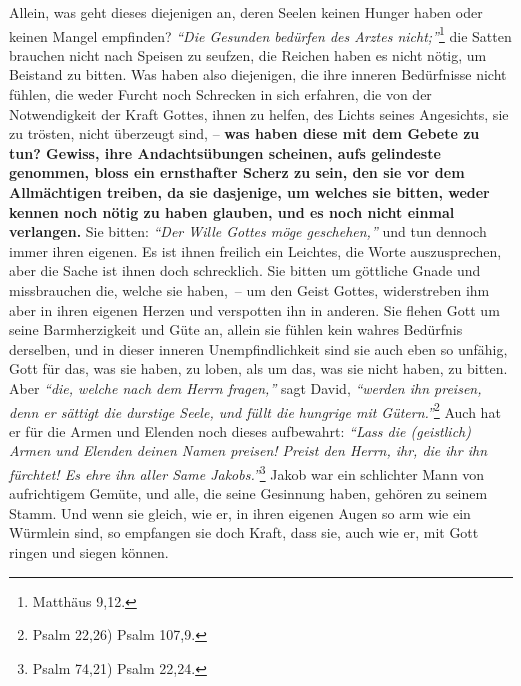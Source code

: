  Allein, was geht dieses
diejenigen an, deren Seelen keinen Hunger haben oder keinen Mangel empfinden?
\textit{"`Die Gesunden bedürfen des Arztes nicht;"'}\footnote{Matthäus 9,12.}
die Satten brauchen nicht nach Speisen zu
seufzen, die Reichen haben es nicht nötig, um Beistand zu bitten. Was haben also
diejenigen, die ihre inneren Bedürfnisse nicht
fühlen, die weder Furcht noch
Schrecken in sich erfahren, die von der Notwendigkeit der Kraft Gottes, ihnen
zu helfen, des Lichts seines Angesichts, sie zu trösten, nicht
überzeugt sind, \label{ref:06_07_sinnlose_gebete}
-- \textbf{was haben diese mit dem Gebete zu tun? Gewiss, ihre Andachtsübungen
scheinen, aufs gelindeste genommen, bloss ein ernsthafter Scherz zu sein, den
sie vor dem Allmächtigen treiben, da sie dasjenige, um welches sie bitten, weder
kennen noch nötig zu haben glauben, und es noch nicht einmal verlangen.} Sie
bitten:
\textit{"`Der Wille Gottes möge geschehen,"'}
und tun dennoch immer ihren
eigenen. Es ist ihnen freilich ein
Leichtes, die Worte auszusprechen, aber die
Sache ist ihnen doch schrecklich. Sie bitten um göttliche Gnade und
missbrauchen die, welche sie haben,~-- um den Geist Gottes, widerstreben ihm
aber in ihren eigenen Herzen und verspotten ihn in anderen.
Sie flehen Gott um
seine Barmherzigkeit und Güte an, allein sie fühlen kein wahres Bedürfnis
derselben, und in dieser inneren Unempfindlichkeit sind sie auch eben so
unfähig, Gott für das, was sie haben, zu loben, als um das, was sie nicht haben,
zu bitten. Aber \textit{"`die, welche nach dem Herrn fragen,"'} sagt David,
\textit{"`werden ihn preisen, denn er sättigt die durstige Seele, und füllt
die hungrige mit Gütern."'}\footnote{Psalm 22,26) Psalm 107,9.}
Auch hat er für die Armen und Elenden
noch dieses aufbewahrt:
\textit{"`Lass die (geistlich) Armen und Elenden deinen
Namen
preisen! Preist den Herrn, ihr, die ihr ihn fürchtet! Es ehre ihn aller Same
Jakobs."'}\footnote{Psalm 74,21) Psalm 22,24.}
Jakob war ein schlichter Mann von
aufrichtigem Gemüte, und alle, die seine Gesinnung haben, gehören zu seinem
Stamm. Und wenn sie gleich, wie er, in ihren eigenen Augen so arm wie ein
Würmlein sind, so empfangen sie doch Kraft, dass sie, auch wie er, mit Gott
ringen und siegen können.

